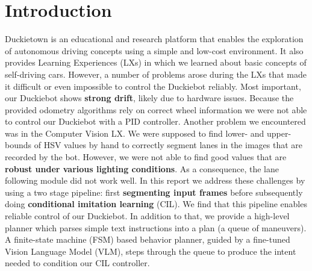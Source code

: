 \chapter{Introduction}
\label{chapter:introduction}

Duckietown is an educational and research platform that enables the exploration of autonomous driving concepts using a simple and low-cost environment. 
It also provides Learning Experiences (LXs) in which we learned about basic concepts of self-driving cars. 
However, a number of problems arose during the LXs that made it difficult or even impossible to control the Duckiebot reliably.
Most important, our Duckiebot shows \textbf{strong drift}, likely due to hardware issues. 
Because the provided odometry algorithms rely on correct wheel information we were not able to control our Duckiebot with a PID controller.
Another problem we encountered was in the Computer Vision LX. We were supposed to find lower- and upper-bounds of HSV values by hand to correctly segment lanes in the images that are recorded by the bot. 
However, we were not able to find good values that are \textbf{robust under various lighting conditions}. 
As a consequence, the lane following module did not work well.
In this report we address these challenges by using a two stage pipeline: first \textbf{segmenting input frames} before subsequently doing \textbf{conditional imitation learning} (CIL). 
We find that this pipeline enables reliable control of our Duckiebot. 
In addition to that, we provide a high-level planner which parses simple text instructions into a plan (a queue of maneuvers). 
A finite-state machine (FSM) based behavior planner, guided by a fine-tuned Vision Language Model (VLM), steps through the queue to produce the intent needed to condition our CIL controller.